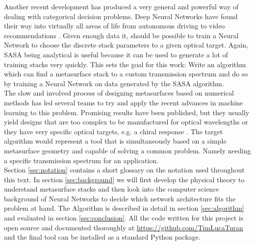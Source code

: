 \indent
Another recent development has produced a very general and powerful way of dealing with categorical decision problems. Deep Neural Networks have found their way into virtually all areas of life from autonomous driving \cite{Dequaire2016} to video recommendations \cite{youtube}. Given enough data it, should be possible to train a Neural Network to choose the discrete stack parameters to a given optical target.
Again, SASA being analytical is useful because it can be used to generate a lot of training stacks very quickly.
This sets the goal for this work: Write an algorithm which can find a metasurface stack to a custom transmission spectrum and do so by training a Neural Network on data generated by the SASA algorithm.
\\

\indent
The slow and involved process of designing metasurfaces based on numerical methods has led several teams to try and apply the recent advances in machine learning to this problem. Promising results have been published, but they usually yield designs that are too complex to be manufactured for optical wavelengths  or they have very specific optical targets, e.g. a chiral response \cite{Ma2018}. The target algorithm would represent a tool that is simultaneously based on a simple metasurface geometry and capable of solving a common problem. Namely needing a specific transmission spectrum for an application.
\\

\indent
Section \ref{sec:notation} contains a short glossary on the notation used throughout this text.
In section \ref{sec:background} we will first develop the physical theory to understand metasurface stacks and then look into the computer science background of Neural Networks to decide which network architecture fits the problem at hand. 
The Algorithm is described in detail in section \ref{sec:algorithm} and evaluated in section \ref{sec:conclusion}.
All the code written for this project is open source and documented thoroughly at \url{https://github.com/TimLucaTuran} and the final tool can be installed as a standard Python package.
